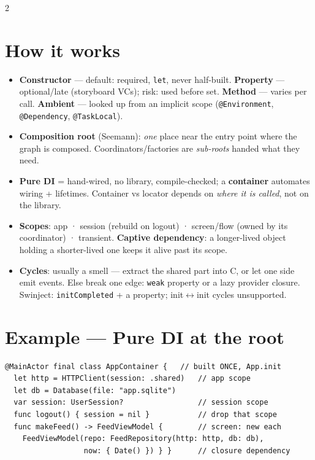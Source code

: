 \documentclass[8pt]{extarticle}
\begin{document}
\begin{multicols}{2}
\raggedright

\section{How it works}
\begin{itemize}
  \item \textbf{Constructor} — default: required, \texttt{let}, never half-built.
        \textbf{Property} — optional/late (storyboard VCs); risk: used before set.
        \textbf{Method} — varies per call. \textbf{Ambient} — looked up from an implicit scope
        (\texttt{@Environment}, \texttt{@Dependency}, \texttt{@TaskLocal}).
  \item \textbf{Composition root} (Seemann): \emph{one} place near the entry point where the
        graph is composed. Coordinators/factories are \emph{sub-roots} handed what they need.
  \item \textbf{Pure DI} = hand-wired, no library, compile-checked; a \textbf{container}
        automates wiring + lifetimes. Container vs locator depends on \emph{where it is
        called}, not on the library.
  \item \textbf{Scopes}: app · session (rebuild on logout) · screen/flow (owned by its
        coordinator) · transient. \textbf{Captive dependency}: a longer-lived object holding a
        shorter-lived one keeps it alive past its scope.
  \item \textbf{Cycles}: usually a smell — extract the shared part into C, or let one side emit
        events. Else break one edge: \texttt{weak} property or a lazy provider closure. Swinject:
        \texttt{initCompleted} + a property; init$\leftrightarrow$init cycles unsupported.
\end{itemize}

\section{Example — Pure DI at the root}
\begin{lstlisting}[language=SwiftSheet]
@MainActor final class AppContainer {   // built ONCE, App.init
  let http = HTTPClient(session: .shared)   // app scope
  let db = Database(file: "app.sqlite")
  var session: UserSession?                 // session scope
  func logout() { session = nil }           // drop that scope
  func makeFeed() -> FeedViewModel {        // screen: new each
    FeedViewModel(repo: FeedRepository(http: http, db: db),
                  now: { Date() }) } }      // closure dependency
\end{lstlisting}


\end{multicols}
\end{document}
